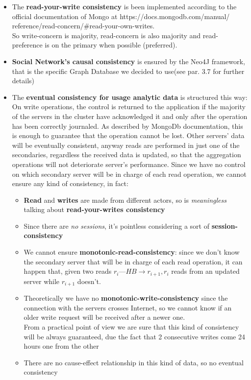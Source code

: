 \begin{itemize}
	\item The \textbf{read-your-write consistency} is been implemented according to the official documentation of Mongo at https://docs.mongodb.com/manual/ reference/read-concern/\#read-your-own-writes. \\
	So write-concern is majority, read-concern is also majority and read-preference is on the primary when possible (preferred). 
 	\item \textbf{Social Network’s causal consistency} is ensured by the Neo4J framework, that is the specific Graph Database we decided to use(see par. 3.7 for further details)
	\item The \textbf{eventual consistency for usage analytic data} is structured this way: On write operations, the control is returned to the application if the majority of the servers in the cluster have acknowledged it and only after the operation has been correctly journaled. As described by MongoDb documentation, this is enough to guarantee that the operation cannot be lost. Other servers’ data will be eventually consistent, anyway reads are performed in just one of the secondaries, regardless the received data is updated, so that the aggregation operations will not deteriorate server’s performance. Since we have no control on which secondary server will be in charge of each read operation, we cannot ensure any kind of consistency, in fact:

	\begin{itemize}
		\item \textbf{Read} and \textbf{writes} are made from different actors, so is \textit{meaningless} talking about \textbf{read-your-writes consistency}
		\item Since there are \textit{no sessions}, it’s pointless considering a sort of \textbf{session-consistency}
		\item We cannot ensure \textbf{monotonic-read-consistency}: since we don’t know the secondary server that will be in charge of each read operation, it can happen that, given two reads $r_{i}—HB \rightarrow r_{i+1}, r_{i}$ reads from an updated server while $r_{i+1}$ doesn’t.
		\item Theoretically we have no \textbf{monotonic-write-consistency} since the connection with the servers crosses Internet, so we cannot know if an older write request will be received after a newer one. \\
		From a practical point of view we are sure that this kind of consistency will be always guaranteed, due the fact that 2 consecutive writes come 24 hours one from the other
		\item There are no cause-effect relationship in this kind of data, so no eventual consistency		
	\end{itemize}
\end{itemize}

